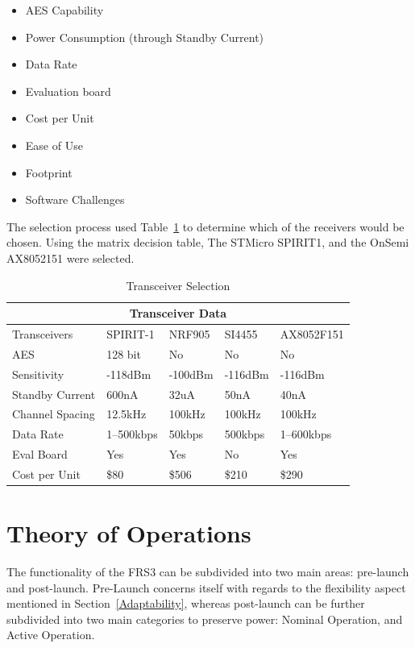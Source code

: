 \documentclass[12pt, twoside]{report}
\begin{document}
\begin{itemize}[noitemsep]
\label{RFCriteria}
\item AES Capability
\item Power Consumption (through Standby Current)
\item Data Rate
\item Evaluation board
\item Cost per Unit
\item Ease of Use
\item Footprint
\item Software Challenges
\end{itemize}

The selection process used Table~\ref{tab:RFTransceiver} to determine which of the receivers would be chosen. Using the matrix decision table, The STMicro SPIRIT1, and the OnSemi AX8052151 were selected.

\begin{table}[h!]
\caption{Transceiver Selection}
\centering
\label{tab:RFTransceiver}
\begin{tabular}{ p{3cm} p{2.3cm} p{2.3cm} p{2.3cm} p{2.3cm} }
 \toprule
 \multicolumn{5}{|c|}{Transceiver Data} \\
 \toprule
Transceivers        & SPIRIT-1 & NRF905 & SI4455 & AX8052F151\\
\midrule
 AES                & 128 bit & No & No & No\\
 Sensitivity        & -118dBm & -100dBm & -116dBm & -116dBm\\
 Standby Current    & 600nA & 32uA&  50nA & 40nA\\
 Channel Spacing    & 12.5kHz & 100kHz & 100kHz & 100kHz\\
 Data Rate          & 1–500kbps & 50kbps & 500kbps & 1–600kbps\\
 Eval Board         & Yes & Yes &  No & Yes\\
 Cost per Unit      & \$80 & \$506 & \$210 & \$290\\
 \bottomrule
\end{tabular}
\end{table}

\section{Theory of Operations}
The functionality of the FRS3 can be subdivided into two main areas: pre-launch and post-launch. Pre-Launch concerns itself with regards to the flexibility aspect mentioned in Section~\ref{Adaptability}, whereas post-launch can be further subdivided into two main categories to preserve power: Nominal Operation, and Active Operation.
\end{document}
